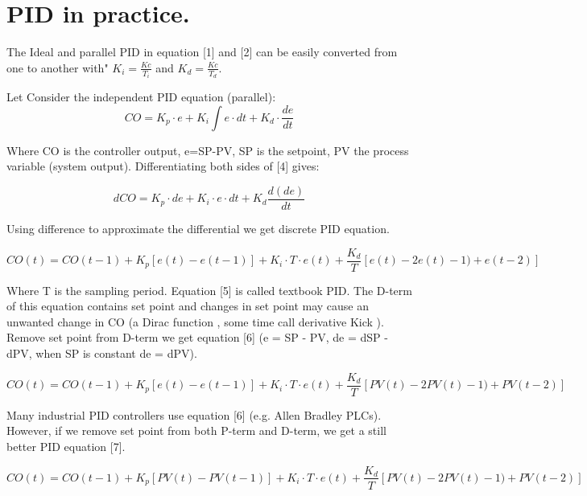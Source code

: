 \section{PID in practice.}
The Ideal and parallel PID in equation [1] and [2] can be easily converted from one to another with"  $K_i = \frac{Kc}{T_i}$ and $K_d = \frac{Kc}{T_d}$.

Let Consider the independent PID equation (parallel):
\begin{equation}
\label{eqn:4}
     CO = K_p\cdot e + K_i\int e\cdot dt +K_d\cdot\frac{de}{dt}
\end{equation}

Where CO is the controller output, e=SP-PV, SP is the setpoint, PV the process variable (system output). Differentiating both sides of [4] gives:

\begin{equation}
\label{eqn:5}
    dCO = K_p\cdot de + K_i\cdot e \cdot dt + K_d\frac{d(de)}{dt}
\end{equation}

Using difference to approximate the differential we get discrete PID equation.

\begin{equation}
\label{eqn:6}
    CO(t) = CO(t-1) + K_p[e(t) - e(t-1)] + K_i\cdot T \cdot e(t) + \frac{K_d}{T}[e(t) - 2e(t)-1) + e(t-2)]
\end{equation}

Where T is the sampling period. Equation [5] is called textbook PID. The D-term of this equation contains set point and changes in set point may cause an unwanted change in CO (a Dirac function \cite{Delta_Function}, some time call derivative Kick ). Remove set point from D-term we get equation [6] (e = SP - PV, de = dSP -dPV, when SP is constant de = dPV).

\begin{equation}
\label{eqn:7}
    CO(t) = CO(t-1) + K_p[e(t) - e(t-1)] + K_i\cdot T \cdot e(t) + \frac{K_d}{T}[PV(t) - 2PV(t)-1) + PV(t-2)]
\end{equation}

Many industrial PID controllers use equation [6] (e.g. Allen Bradley PLCs). However, if we remove set point from both P-term and D-term, we get a still better PID equation [7].

\begin{equation}
\label{eqn:8}
    CO(t) = CO(t-1) + K_p[PV(t) - PV(t-1)] + K_i\cdot T \cdot e(t) + \frac{K_d}{T}[PV(t) - 2PV(t)-1) + PV(t-2)]
\end{equation}

